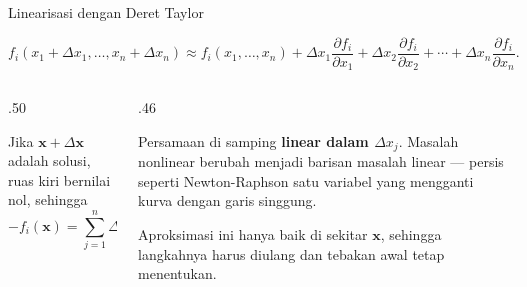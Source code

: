 \documentclass[aspectratio=169,10pt]{beamer}
\begin{document}
\begin{frame}{Linearisasi dengan Deret Taylor}
\scriptsize
\begin{bluebox}
\[
f_i(x_1+\Delta x_1,\dots,x_n+\Delta x_n)\approx f_i(x_1,\dots,x_n)+\Delta x_1\frac{\partial f_i}{\partial x_1}+\Delta x_2\frac{\partial f_i}{\partial x_2}+\cdots+\Delta x_n\frac{\partial f_i}{\partial x_n}.
\]
\end{bluebox}
\vspace{1mm}
\begin{columns}[T,totalwidth=\textwidth]
\begin{column}{.50\textwidth}
\begin{orangebox}
Jika $\mathbf{x}+\Delta\mathbf{x}$ adalah solusi, ruas kiri bernilai nol, sehingga
\[
-f_i(\mathbf{x})=\sum_{j=1}^{n}\Delta x_j\frac{\partial f_i}{\partial x_j},\quad i=1,\dots,m.
\]
\end{orangebox}
\end{column}
\begin{column}{.46\textwidth}
\begin{greenbox}
Persamaan di samping \textbf{linear dalam $\Delta x_j$}. Masalah nonlinear berubah menjadi barisan masalah linear --- persis seperti Newton-Raphson satu variabel yang mengganti kurva dengan garis singgung.
\end{greenbox}
\begin{goldbox}
Aproksimasi ini hanya baik di sekitar $\mathbf{x}$, sehingga langkahnya harus diulang dan tebakan awal tetap menentukan.
\end{goldbox}
\end{column}
\end{columns}
\end{frame}
\end{document}
